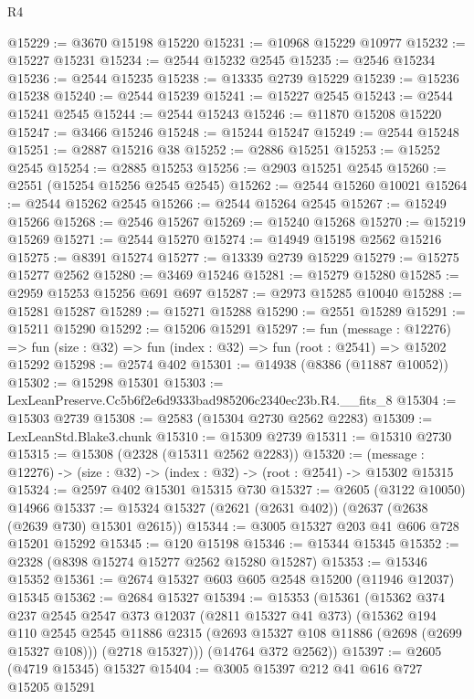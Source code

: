 \begin{lexlean}{R4}
\begin{coremodule}
@15229 := @3670 @15198 @15220
@15231 := @10968 @15229 @10977
@15232 := @15227 @15231
@15234 := @2544 @15232 @2545
@15235 := @2546 @15234
@15236 := @2544 @15235
@15238 := @13335 @2739 @15229
@15239 := @15236 @15238
@15240 := @2544 @15239
@15241 := @15227 @2545
@15243 := @2544 @15241 @2545
@15244 := @2544 @15243
@15246 := @11870 @15208 @15220
@15247 := @3466 @15246
@15248 := @15244 @15247
@15249 := @2544 @15248
@15251 := @2887 @15216 @38
@15252 := @2886 @15251
@15253 := @15252 @2545
@15254 := @2885 @15253
@15256 := @2903 @15251 @2545
@15260 := @2551 (@15254 @15256 @2545 @2545)
@15262 := @2544 @15260 @10021
@15264 := @2544 @15262 @2545
@15266 := @2544 @15264 @2545
@15267 := @15249 @15266
@15268 := @2546 @15267
@15269 := @15240 @15268
@15270 := @15219 @15269
@15271 := @2544 @15270
@15274 := @14949 @15198 @2562 @15216
@15275 := @8391 @15274
@15277 := @13339 @2739 @15229
@15279 := @15275 @15277 @2562
@15280 := @3469 @15246
@15281 := @15279 @15280
@15285 := @2959 @15253 @15256 @691 @697
@15287 := @2973 @15285 @10040
@15288 := @15281 @15287
@15289 := @15271 @15288
@15290 := @2551 @15289
@15291 := @15211 @15290
@15292 := @15206 @15291
@15297 := fun (message : @12276) =>
  fun (size : @32) => fun (index : @32) => fun (root : @2541) => @15202 @15292
@15298 := @2574 @402
@15301 := @14938 (@8386 (@11887 @10052))
@15302 := @15298 @15301
@15303 := LexLeanPreserve.Cc5b6f2e6d9333bad985206c2340ec23b.R4.__fits_8
@15304 := @15303 @2739
@15308 := @2583 (@15304 @2730 @2562 @2283)
@15309 := LexLeanStd.Blake3.chunk
@15310 := @15309 @2739
@15311 := @15310 @2730
@15315 := @15308 (@2328 (@15311 @2562 @2283))
@15320 := (message : @12276) -> (size : @32) -> (index : @32) -> (root : @2541) -> @15302 @15315
@15324 := @2597 @402 @15301 @15315 @730
@15327 := @2605 (@3122 @10050) @14966
@15337 := @15324 @15327 (@2621 (@2631 @402)) (@2637 (@2638 (@2639 @730) @15301 @2615))
@15344 := @3005 @15327 @203 @41 @606 @728 @15201 @15292
@15345 := @120 @15198
@15346 := @15344 @15345
@15352 := @2328 (@8398 @15274 @15277 @2562 @15280 @15287)
@15353 := @15346 @15352
@15361 := @2674 @15327 @603 @605 @2548 @15200 (@11946 @12037) @15345
@15362 := @2684 @15327
@15394 := @15353
    (@15361
      (@15362
        @374
        @237
        @2545
        @2547
        @373
        @12037
        (@2811 @15327 @41 @373)
        (@15362
          @194
          @110
          @2545
          @2545
          @11886
          @2315
          (@2693 @15327 @108 @11886 (@2698 (@2699 @15327 @108)))
          (@2718 @15327)))
      (@14764 @372 @2562))
@15397 := @2605 (@4719 @15345) @15327
@15404 := @3005 @15397 @212 @41 @616 @727 @15205 @15291

\end{coremodule}
\end{lexlean}
